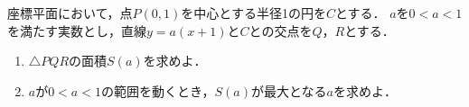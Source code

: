 \documentclass[../../main.tex]{subfiles}
\begin{document}
座標平面において，点$P(0,1)$を中心とする半径1の円を$C$とする．
$a$を$0<a<1$を満たす実数とし，直線$y=a(x+1)$と$C$との交点を$Q$，$R$とする．
\begin{enumerate}
  \item $\triangle PQR$の面積$S(a)$を求めよ．
  \item $a$が$0<a<1$の範囲を動くとき，$S(a)$が最大となる$a$を求めよ．
\end{enumerate}
\end{document}
